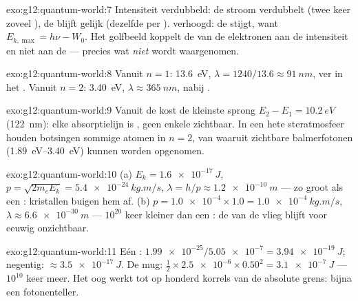 \begin{solution}{exo:g12:quantum-world:7}
Intensiteit verdubbeld: de stroom verdubbelt (twee keer zoveel ), de
 blijft gelijk (dezelfde  per ).  verhoogd:
de  stijgt, want $E_{k,\max} = h\nu - W_0$. Het golfbeeld koppelt
de  van de elektronen aan de intensiteit en niet aan de  ---
precies wat \emph{niet} wordt waargenomen.
\end{solution}

\begin{solution}{exo:g12:quantum-world:8}
Vanuit $n = 1$: \qty{13.6}{eV}, $\lambda = 1240/13.6 \approx \qty{91}{nm}$,
ver in het . Vanuit $n = 2$: \qty{3.40}{eV},
$\lambda \approx \qty{365}{nm}$, nabij .
\end{solution}

\begin{solution}{exo:g12:quantum-world:9}
Vanuit de  kost de kleinste sprong $E_2 - E_1 = \qty{10.2}{eV}$
(\qty{122}{nm}): elke absorptielijn is , geen enkele zichtbaar. In
een hete steratmosfeer houden botsingen sommige atomen in $n = 2$, van waaruit
zichtbare balmerfotonen (\qtyrange{1.89}{3.40}{eV}) kunnen worden opgenomen.
\end{solution}

\begin{solution}{exo:g12:quantum-world:10}
(a) $E_k = \qty{1.6e-17}{J}$, $p = \sqrt{2m_e E_k} = \qty{5.4e-24}{kg.m/s}$,
$\lambda = h/p \approx \qty{1.2e-10}{m}$ --- zo groot als een : kristallen
buigen hem af. (b) $p = \num{1.0e-4} \times 1.0 = \qty{1.0e-4}{kg.m/s}$,
$\lambda \approx \qty{6.6e-30}{m}$ --- $10^{20}$ keer kleiner dan een :
de  van de vlieg blijft voor eeuwig onzichtbaar.
\end{solution}

\begin{solution}{exo:g12:quantum-world:11}
Eén : $\num{1.99e-25}/\num{5.05e-7} = \qty{3.94e-19}{J}$; negentig:
$\approx \qty{3.5e-17}{J}$. De mug: $\tfrac12 \times \num{2.5e-6}
\times 0.50^2 = \qty{3.1e-7}{J}$ --- $10^{10}$ keer meer. Het oog werkt tot op
honderd korrels van de absolute grens: bijna een fotonenteller.
\end{solution}

